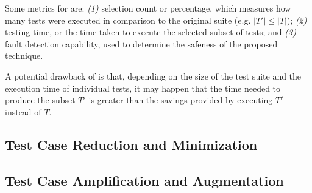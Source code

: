 Some metrics for \tcs are: \textit{(1)} selection count or percentage, which measures how many tests were executed in comparison to the original suite (e.g. $|T'| \leq |T|$); \textit{(2)} testing time, or the time taken to execute the selected subset of tests; and \textit{(3)} fault detection capability, used to determine the safeness of the proposed technique.

A potential drawback of \tcs is that, depending on the size of the test suite and the execution time of individual tests, it may happen that the time needed to produce the subset $T'$ is greater than the savings provided by executing $T'$ instead of $T$. 

\subsection{Test Case Reduction and Minimization}\label{sec:tsr}

\subsection{Test Case Amplification and Augmentation}\label{sec:tsa}
